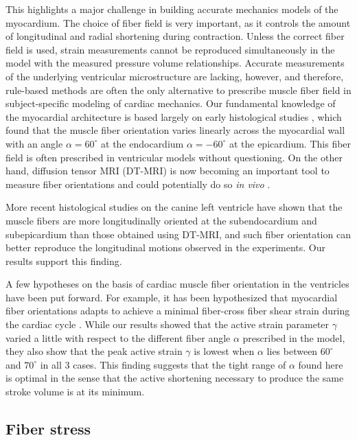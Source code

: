 This highlights a major challenge in building accurate mechanics
models of the myocardium.  The choice of fiber field is very
important, as it controls the amount of longitudinal and radial
shortening during contraction. Unless the correct fiber
field is used, strain measurements cannot be reproduced simultaneously
in the model with the measured pressure volume relationships.
Accurate measurements of the underlying ventricular microstructure are
lacking, however, and therefore, rule-based methods
\citep{bayer2012novel} are often the only alternative to prescribe
muscle fiber field in subject-specific modeling of cardiac mechanics. 
Our fundamental knowledge of the myocardial
architecture is based largely on early histological studies
\citep{streeter1969fiber}, which found that the muscle fiber
orientation varies linearly across the myocardial wall  with an angle
$\alpha = 60^{\circ}$ at the endocardium $\alpha = -60^\circ$ at the
epicardium. This fiber field is often prescribed in ventricular models
without questioning. On the other hand, diffusion tensor MRI (DT-MRI) is now
becoming an important tool to measure fiber orientations and could
potentially do so \textit{in vivo} \citep{toussaint2013vivo}.

More recent histological
studies \citep{legrice1995laminar} on the canine left ventricle have shown that the muscle
fibers are more longitudinally oriented at the subendocardium and
subepicardium than those obtained using DT-MRI, and such fiber orientation can better
reproduce the longitudinal motions observed in the
experiments\citep{wang2015image}. Our results support this finding. 

A few hypotheses on the basis of cardiac muscle fiber orientation in
the ventricles have been put forward. 
For example, it has been hypothesized that myocardial fiber orientations adapts to
achieve a minimal fiber-cross fiber shear strain during the cardiac
cycle \citep{kroon2009computational}.
While our results showed that the active strain parameter $\gamma$
varied a little with respect to the different fiber angle $\alpha$
prescribed in the model, they also show that the peak active strain
$\gamma$ is lowest when $\alpha$ lies between $60^\circ$ and
$70^\circ$ in all 3 cases. This finding suggests that the tight range
of $\alpha$ found here is optimal in the sense that the active
shortening necessary to produce the same stroke volume is at its
minimum. 


\subsection{Fiber stress}


